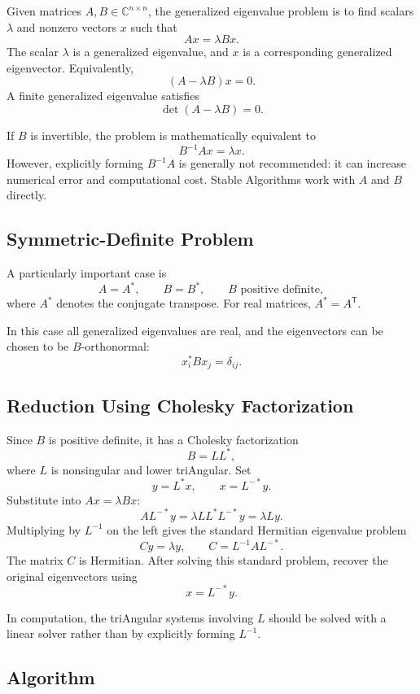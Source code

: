 \documentclass[a4paper, 10pt, onepage]{elegantbook}
\begin{document}
{Given matrices \(A,B\in\mathbb{C}^{n\times n}\), the generalized
eigenvalue problem is to find scalars \(\lambda\) and nonzero vectors
\(x\) such that
\[
Ax=\lambda Bx.
\]
The scalar \(\lambda\) is a generalized eigenvalue, and \(x\) is a
corresponding generalized eigenvector. Equivalently,
\[
(A-\lambda B)x=0.
\]
A finite generalized eigenvalue satisfies
\[
\det(A-\lambda B)=0.
\]

If \(B\) is invertible, the problem is mathematically equivalent to
\[
B^{-1}Ax=\lambda x.
\]
However, explicitly forming \(B^{-1}A\) is generally not recommended:
it can increase numerical error and computational cost. Stable
Algorithms work with \(A\) and \(B\) directly.

\subsection{Symmetric-Definite Problem}

\noindent

A particularly important case is
\[
A=A^*, \qquad B=B^*, \qquad B\text{ positive definite},
\]
where \(A^*\) denotes the conjugate transpose. For real matrices,
\(A^*=A^{\mathsf T}\).

In this case all generalized eigenvalues are real, and the eigenvectors
can be chosen to be \(B\)-orthonormal:
\[
x_i^*Bx_j=\delta_{ij}.
\]

\subsection{Reduction Using Cholesky Factorization}

\noindent

Since \(B\) is positive definite, it has a Cholesky factorization
\[
B=LL^*,
\]
where \(L\) is nonsingular and lower triAngular. Set
\[
y=L^*x,\qquad x=L^{-*}y.
\]
Substitute into \(Ax=\lambda Bx\):
\[
AL^{-*}y=\lambda LL^*L^{-*}y
          =\lambda Ly.
\]
Multiplying by \(L^{-1}\) on the left gives the standard Hermitian
eigenvalue problem
\[
Cy=\lambda y,
\qquad
C=L^{-1}AL^{-*}.
\]
The matrix \(C\) is Hermitian. After solving this standard problem,
recover the original eigenvectors using
\[
x=L^{-*}y.
\]

In computation, the triAngular systems involving \(L\) should be solved
with a linear solver rather than by explicitly forming \(L^{-1}\).

\subsection{Algorithm}

}
\end{document}
